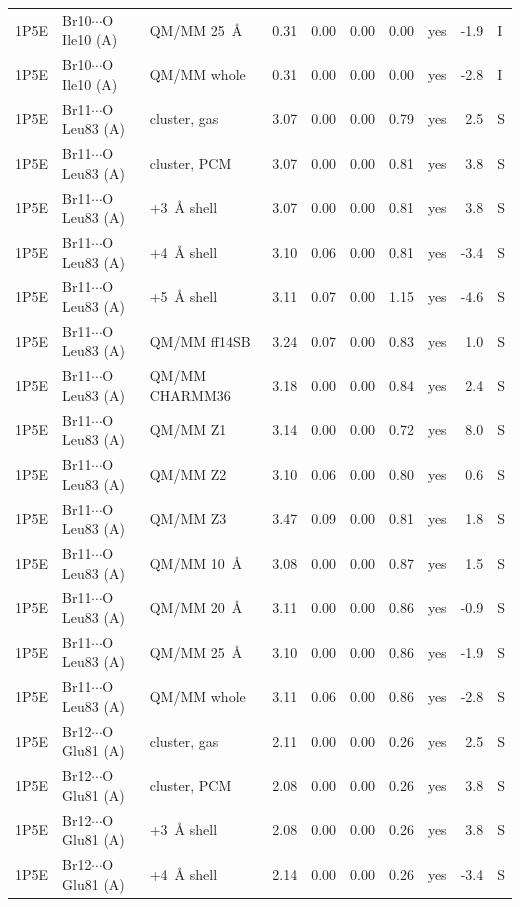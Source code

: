 {\begin{longtable}{lllrrrrlrl}
1P5E & Br10$\cdots$O Ile10 (A) & QM/MM 25~\AA{} & 0.31 & 0.00 & 0.00 & 0.00 & yes & -1.9 & I\\
1P5E & Br10$\cdots$O Ile10 (A) & QM/MM whole & 0.31 & 0.00 & 0.00 & 0.00 & yes & -2.8 & I\\
1P5E & Br11$\cdots$O Leu83 (A) & cluster, gas & 3.07 & 0.00 & 0.00 & 0.79 & yes & 2.5 & S\\
1P5E & Br11$\cdots$O Leu83 (A) & cluster, PCM & 3.07 & 0.00 & 0.00 & 0.81 & yes & 3.8 & S\\
1P5E & Br11$\cdots$O Leu83 (A) & +3~\AA{} shell & 3.07 & 0.00 & 0.00 & 0.81 & yes & 3.8 & S\\
1P5E & Br11$\cdots$O Leu83 (A) & +4~\AA{} shell & 3.10 & 0.06 & 0.00 & 0.81 & yes & -3.4 & S\\
1P5E & Br11$\cdots$O Leu83 (A) & +5~\AA{} shell & 3.11 & 0.07 & 0.00 & 1.15 & yes & -4.6 & S\\
1P5E & Br11$\cdots$O Leu83 (A) & QM/MM ff14SB & 3.24 & 0.07 & 0.00 & 0.83 & yes & 1.0 & S\\
1P5E & Br11$\cdots$O Leu83 (A) & QM/MM CHARMM36 & 3.18 & 0.00 & 0.00 & 0.84 & yes & 2.4 & S\\
1P5E & Br11$\cdots$O Leu83 (A) & QM/MM Z1 & 3.14 & 0.00 & 0.00 & 0.72 & yes & 8.0 & S\\
1P5E & Br11$\cdots$O Leu83 (A) & QM/MM Z2 & 3.10 & 0.06 & 0.00 & 0.80 & yes & 0.6 & S\\
1P5E & Br11$\cdots$O Leu83 (A) & QM/MM Z3 & 3.47 & 0.09 & 0.00 & 0.81 & yes & 1.8 & S\\
1P5E & Br11$\cdots$O Leu83 (A) & QM/MM 10~\AA{} & 3.08 & 0.00 & 0.00 & 0.87 & yes & 1.5 & S\\
1P5E & Br11$\cdots$O Leu83 (A) & QM/MM 20~\AA{} & 3.11 & 0.00 & 0.00 & 0.86 & yes & -0.9 & S\\
1P5E & Br11$\cdots$O Leu83 (A) & QM/MM 25~\AA{} & 3.10 & 0.00 & 0.00 & 0.86 & yes & -1.9 & S\\
1P5E & Br11$\cdots$O Leu83 (A) & QM/MM whole & 3.11 & 0.06 & 0.00 & 0.86 & yes & -2.8 & S\\
1P5E & Br12$\cdots$O Glu81 (A) & cluster, gas & 2.11 & 0.00 & 0.00 & 0.26 & yes & 2.5 & S\\
1P5E & Br12$\cdots$O Glu81 (A) & cluster, PCM & 2.08 & 0.00 & 0.00 & 0.26 & yes & 3.8 & S\\
1P5E & Br12$\cdots$O Glu81 (A) & +3~\AA{} shell & 2.08 & 0.00 & 0.00 & 0.26 & yes & 3.8 & S\\
1P5E & Br12$\cdots$O Glu81 (A) & +4~\AA{} shell & 2.14 & 0.00 & 0.00 & 0.26 & yes & -3.4 & S\\

\end{longtable}}
